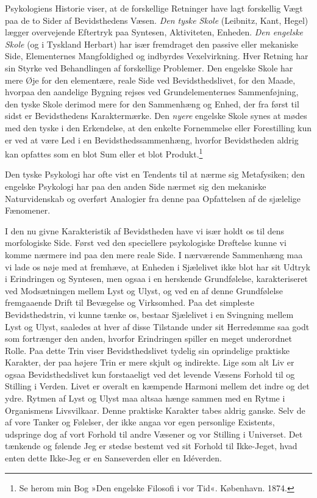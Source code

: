 \documentclass[12pt,a4paper,openany]{book}
\newcommand{\opage}[1]{\marginnote{\footnotesize\textit{[#1]}}}
\begin{document}
Psykologiens Historie viser, at de forskellige Retninger have lagt
forskellig Vægt paa de to Sider af Bevidsthedens Væsen. \emph{Den tyske
Skole} (Leibnitz, Kant, Hegel) lægger overvejende Eftertryk paa
Syntesen, Aktiviteten, Enheden. \emph{Den engelske Skole} (og i Tyskland
Herbart) har især fremdraget den passive eller mekaniske Side,
Elementernes Mangfoldighed og indbyrdes Vexelvirkning. Hver Retning har
sin Styrke ved Behandlingen af forskellige Problemer. Den engelske Skole
har mere Øje for den elementære, reale Side ved Bevidsthedslivet, for
den Maade, hvorpaa den aandelige Bygning rejses ved Grundelementernes
Sammenføjning, den tyske Skole derimod mere for den Sammenhæng og Enhed,
der fra først til sidst er Bevidsthedens Karaktermærke. Den \emph{nyere}
engelske Skole synes at mødes med den tyske i den
\opage{60}Erkendelse, at den enkelte Fornemmelse eller Forestilling kun
er ved at være Led i en Bevidsthedssammenhæng, hvorfor Bevidstheden
aldrig kan opfattes som en blot Sum eller et blot
Produkt.\footnote[1]{Se herom min Bog »Den engelske Filosofi i vor Tid«.
København. 1874.}

Den tyske Psykologi har ofte vist en Tendents til at nærme sig
Metafysiken; den engelske Psykologi har paa den anden Side nærmet sig
den mekaniske Naturvidenskab og overført Analogier fra denne paa
Opfattelsen af de sjælelige Fænomener.

I den nu givne Karakteristik af Bevidstheden have vi især holdt os til
dens morfologiske Side. Først ved den speciellere psykologiske Drøftelse
kunne vi komme nærmere ind paa den mere reale Side. I nærværende
Sammenhæng maa vi lade os nøje med at fremhæve, at Enheden i Sjælelivet
ikke blot har sit Udtryk i Erindringen og Syntesen, men ogsaa i en
herskende Grundfølelse, karakteriseret ved Modsætningen mellem Lyst og
Ulyst, og ved en af denne Grundfølelse fremgaaende Drift til Bevægelse
og Virksomhed. Paa det simpleste Bevidsthedstrin, vi kunne tænke os,
bestaar Sjælelivet i en Svingning mellem Lyst og Ulyst, saaledes at hver
af disse Tilstande under sit Herredømme saa godt som fortrænger den
anden, hvorfor Erindringen spiller en meget underordnet Rolle. Paa dette
Trin viser Bevidsthedslivet tydelig sin oprindelige praktiske Karakter,
der paa højere Trin er mere skjult og indirekte. Lige som alt Liv er
ogsaa Bevidsthedslivet kun forstaaeligt ved det levende Væsens Forhold
til og Stilling i Verden. Livet er overalt en kæmpende Harmoni mellem
det indre og det ydre. Rytmen af Lyst og Ulyst maa altsaa hænge sammen
med en Rytme i Organismens Livsvilkaar. Denne praktiske Karakter tabes
aldrig ganske. Selv de af vore Tanker og Følelser, der ikke angaa vor
egen personlige Existents, udspringe dog af vort Forhold til andre
Væsener og vor Stilling i Universet. Det tænkende og følende Jeg er
stedse bestemt ved sit Forhold til Ikke-Jeget, hvad enten dette Ikke-Jeg
er en Sanseverden eller en Idéverden.
\end{document}

